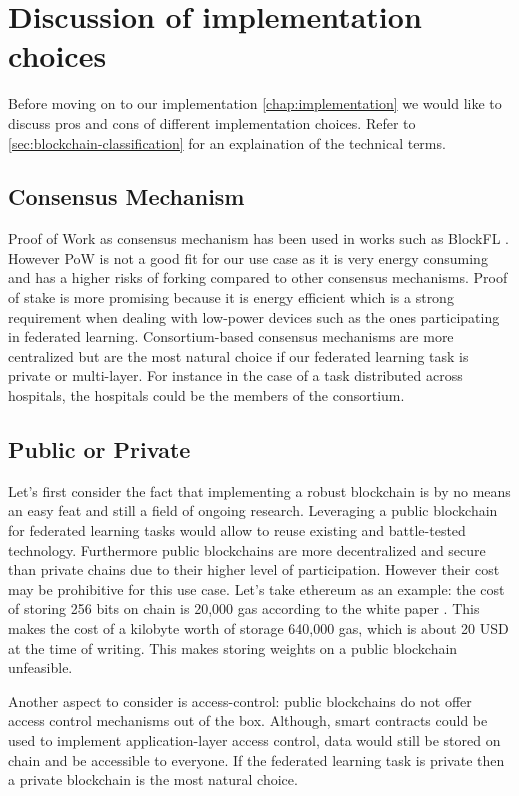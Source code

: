 \section{Discussion of implementation choices}\label{sec:bfl-implementation}
Before moving on to our implementation \ref{chap:implementation} we would like to discuss pros and cons of
different implementation choices. Refer to \ref{sec:blockchain-classification} for an explaination of the
technical terms.

\subsection{Consensus Mechanism} Proof of Work as consensus mechanism has been used in works such as BlockFL
\cite{BlockFL}.
However PoW is not a good fit for our use case as it is very energy consuming and has a higher risks of
forking compared to other consensus mechanisms.
Proof of stake is more promising because it is energy efficient which is a strong requirement when dealing
with low-power devices such as the ones participating in federated learning.
Consortium-based consensus mechanisms are more centralized but are the most natural choice if our federated
learning task is private or multi-layer.
For instance in the case of a task distributed across hospitals, the hospitals could be the members of the consortium.

\subsection{Public or Private}
Let's first consider the fact that implementing a robust blockchain is by no means an easy feat and still a
field of ongoing research. Leveraging a public blockchain for federated learning tasks would allow to reuse
existing and battle-tested technology. Furthermore public blockchains are more decentralized and secure than
private chains due to their higher level of participation.
However their cost may be prohibitive for this use case.
Let's take ethereum as an example: the cost of storing 256 bits on chain is 20,000 gas according to the white
paper \cite{Ethereum}. This makes the cost of a kilobyte worth of storage 640,000 gas, which is about 20 USD
at the time of writing.
This makes storing weights on a public blockchain unfeasible.

Another aspect to consider is access-control: public blockchains do not offer access control mechanisms out of the box.
Although, smart contracts could be used to implement application-layer access control, data would still be
stored on chain and be accessible to everyone.
If the federated learning task is private then a private blockchain is the most natural choice.

